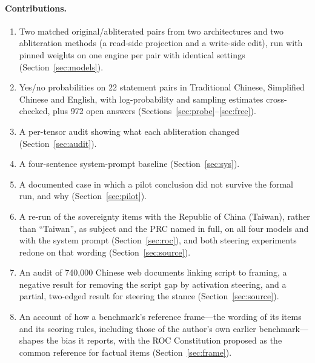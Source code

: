 \documentclass[11pt,a4paper]{article}
\begin{document}
\paragraph{Contributions.}
\begin{enumerate}
  \item Two matched original/abliterated pairs from two architectures and two abliteration methods (a read-side
  projection and a write-side edit), run with pinned weights on one engine per pair with identical settings
  (Section~\ref{sec:models}).
  \item Yes/no probabilities on 22 statement pairs in Traditional Chinese, Simplified Chinese and English, with
  log-probability and sampling estimates cross-checked, plus 972 open answers (Sections~\ref{sec:probe}--\ref{sec:free}).
  \item A per-tensor audit showing what each abliteration changed (Section~\ref{sec:audit}).
  \item A four-sentence system-prompt baseline (Section~\ref{sec:sys}).
  \item A documented case in which a pilot conclusion did not survive the formal run, and why
  (Section~\ref{sec:pilot}).
  \item A re-run of the sovereignty items with the Republic of China (Taiwan), rather than ``Taiwan'', as subject and
  the PRC named in full, on all four models and with the system prompt (Section~\ref{sec:roc}), and both steering experiments redone on that wording (Section~\ref{sec:source}).
  \item An audit of 740,000 Chinese web documents linking script to framing, a negative result for removing the
  script gap by activation steering, and a partial, two-edged result for steering the stance (Section~\ref{sec:source}).
  \item An account of how a benchmark's reference frame---the wording of its items and its scoring rules, including
  those of the author's own earlier benchmark---shapes the bias it reports, with the ROC Constitution proposed as the
  common reference for factual items (Section~\ref{sec:frame}).
\end{enumerate}
\end{document}
